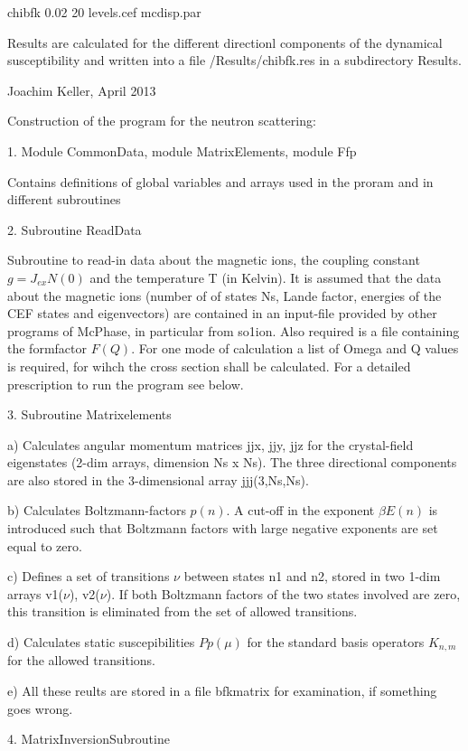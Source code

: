 chibfk 0.02 20 levels.cef mcdisp.par

Results are calculated for the different directionl components of the
dynamical susceptibility and written into a file /Results/chibfk.res in a
subdirectory Results. 
 
Joachim Keller, April 2013 


\vfill
\eject
\parindent=0pt
{\large Construction of the program for the neutron scattering:}


1. Module CommonData, module MatrixElements, module Ffp

Contains definitions of global variables and arrays used in the proram and
in different  subroutines 

2. Subroutine ReadData

Subroutine to read-in data about the magnetic ions, the coupling 
constant $g=J_{ex} N(0)$ and the temperature  T (in Kelvin). 
It is assumed that the data about the
magnetic ions (number of of states Ns, Lande factor, energies of the 
CEF states and 
eigenvectors) are contained in an input-file provided by other 
programs of McPhase, in particular from so1ion. Also required is a file
containing the formfactor $F(Q)$. For one mode of calculation a list of
Omega and Q values is required, for wihch the cross section shall be
calculated.  For a detailed prescription to run the program see below.


3. Subroutine Matrixelements

a) Calculates angular momentum matrices jjx, jjy, jjz for the crystal-field eigenstates
(2-dim arrays, dimension Ns x Ns). The three directional components are also
stored in the 3-dimensional array jjj(3,Ns,Ns). 

b) Calculates Boltzmann-factors $p(n)$. A cut-off in the exponent $\beta
E(n)$ is introduced such that Boltzmann factors with large negative
exponents
are set equal to zero. 

c) Defines  a set of transitions  $\nu$  between states
n1 and n2, stored in two  1-dim
arrays v1($\nu$), v2($\nu$). If both Boltzmann factors of the two states
involved are zero, this transition is eliminated from the set of allowed
transitions.  

d) Calculates static suscepibilities $Pp(\mu)$ for the standard basis operators
$K_{n,m}$ for the allowed transitions.  

e) All these reults are stored in a  file bfkmatrix for examination, if
something goes wrong.
 

4. MatrixInversionSubroutine


